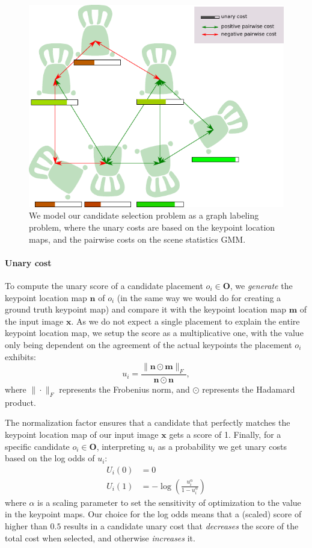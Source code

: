 \documentclass[10pt,twocolumn,letterpaper]{article}
\newcommand{\bb}[1]{{\bm{#1}}}
\begin{document}
\begin{figure}
    \includegraphics[width=\linewidth]{figures/graph_example/graph_example}
    \caption[Candidate selection visualization]{We model our candidate selection problem as a graph labeling problem, where the unary costs are based on the keypoint location maps, and the pairwise costs on the scene statistics GMM.}
    \label{fig:ch4:graph_example}
\end{figure}

\paragraph{Unary cost} To compute the unary score of a candidate placement $o_i \in \bb{O}$,
we \emph{generate} the keypoint location map $\bb{n}$ of $o_i$ (in the same
way we would do for creating a ground truth keypoint map) and compare it with
the keypoint location map $\bb{m}$ of the input image $\bb{x}$.  As we do not expect a
single placement to explain the entire keypoint location map, we setup the score
as a multiplicative one, with the value only being dependent on the agreement
of the actual keypoints the placement $o_i$ exhibits:
%
\[ u_i = \frac{\|\bb{n} \odot \bb{m}\|_F}{\bb{n} \odot \bb{n}}, \]
%
where $\|\cdot\|_F$ represents the Frobenius norm, and $\odot$ represents the Hadamard product.

The normalization factor ensures that a candidate that perfectly matches the
keypoint location map of our input image $\bb{x}$ gets a score of 1.  Finally, for a specific
candidate $o_i \in \bb{O}$, interpreting $u_i$ as a probability we get unary costs based on the log odds of $u_i$:
\begin{align}
    U_i(0) &= 0 \\
    U_i(1) &= -\log\left(\frac{u_i^\alpha}{1 - u_i^\alpha}\right)
\end{align}
where $\alpha$ is a scaling parameter to set the sensitivity of optimization to
the value in the keypoint maps. Our choice for the log odds means that a (scaled) score
of higher than $0.5$ results in a candidate unary cost that \emph{decreases} the score of the total
cost when selected, and otherwise \emph{increases} it.
\end{document}
